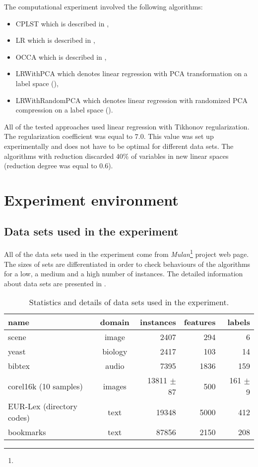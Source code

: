 \documentclass[english,a4paper,twoside]{ppfcmthesis}
\begin{document}
The computational experiment involved the following algorithms:
\begin{itemize}
    \item CPLST which is described in , 
    \item LR which is described in ,
    \item OCCA which is described in ,
    \item LRWithPCA which denotes linear regression with PCA transformation on a label space (),
    \item LRWithRandomPCA which denotes linear regression with randomized PCA compression on a label space ().
\end{itemize}
All of the tested approaches used linear regression with Tikhonov regularization. The regularization coefficient was equal to $7.0$. This value was set up experimentally and does not have to be optimal for different data sets. The algorithms with reduction discarded $40\%$ of variables in new linear spaces (reduction degree was equal to $0.6$).


\section{Experiment environment}
\subsection{Data sets used in the experiment}

All of the data sets used in the experiment come from \textit{Mulan}\footnote{} project web page. The sizes of sets are differentiated in order to check behaviours of the algorithms for a low, a medium and a high number of instances. The detailed information about data sets are presented in . 

\begin{table}[h]
\centering
\caption{Statistics and details of data sets used in the experiment.}
\label{tab:exp1}
    \begin{tabular}{l|c|r|r|r}
    name & domain & instances & features & labels \\ \hline \hline
    scene & image &  2407  & 294 & 6 \\   
    yeast & biology & 2417 & 103 & 14 \\
    bibtex & audio & 7395 & 1836 & 159 \\
    corel16k (10 samples) & images & 13811 $\pm$ 87 & 500 & 161 $\pm$ 9\\
    EUR-Lex (directory codes) & text & 19348 & 5000 & 412 \\
    bookmarks & text & 87856 & 2150 & 208
    \end{tabular}
\end{table}
\end{document}
